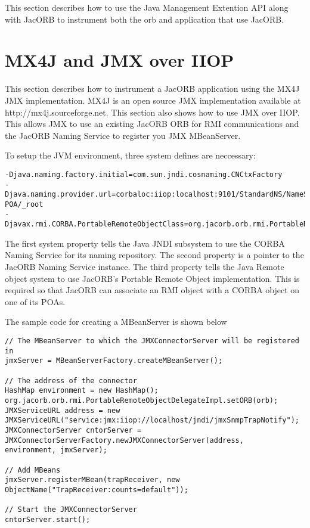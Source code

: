 
This section describes how to use the Java Management Extention API along with JacORB to
instrument both the orb and application that use JacORB.

\section{MX4J and JMX over IIOP}

This section describes how to instrument a JacORB application using the MX4J JMX implementation.
MX4J is an open source JMX implementation available at http://mx4j.sourceforge.net. This section
also shows how to use JMX over IIOP. This allows JMX to use an existing JacORB ORB for RMI
communications and the JacORB Naming Service to register you JMX MBeanServer.

To setup the JVM environment, three system defines are neccessary:

\begin{scriptsize}
\begin{verbatim}
-Djava.naming.factory.initial=com.sun.jndi.cosnaming.CNCtxFactory
-Djava.naming.provider.url=corbaloc:iiop:localhost:9101/StandardNS/NameServer-POA/_root
-Djavax.rmi.CORBA.PortableRemoteObjectClass=org.jacorb.orb.rmi.PortableRemoteObjectDelegateImpl
\end{verbatim}
\end{scriptsize}

The first system property tells the Java JNDI subsystem to use the CORBA Naming Service for its
naming repository. The second property is a pointer to the JacORB Naming Service instance. The
third property tells the Java Remote object system to use JacORB's Portable Remote Object implementation. This is required so that JacORB can associate an RMI object with a CORBA object on one of its POAs.

The sample code for creating a MBeanServer is shown below

\begin{scriptsize}
\begin{verbatim}
// The MBeanServer to which the JMXConnectorServer will be registered in
jmxServer = MBeanServerFactory.createMBeanServer();
            
// The address of the connector
HashMap environment = new HashMap();
org.jacorb.orb.rmi.PortableRemoteObjectDelegateImpl.setORB(orb);
JMXServiceURL address = new JMXServiceURL("service:jmx:iiop://localhost/jndi/jmxSnmpTrapNotify");
JMXConnectorServer cntorServer = JMXConnectorServerFactory.newJMXConnectorServer(address,                                             environment, jmxServer);
            
// Add MBeans
jmxServer.registerMBean(trapReceiver, new ObjectName("TrapReceiver:counts=default"));
            
// Start the JMXConnectorServer
cntorServer.start();
\end{verbatim}
\end{scriptsize}

